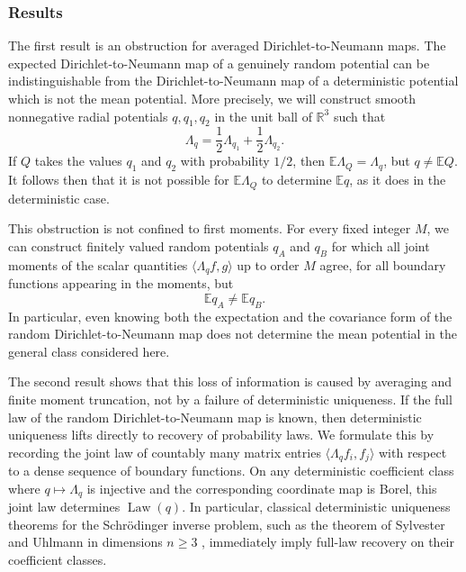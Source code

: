 \documentclass[11pt]{article}
\newcommand{\R}{\mathbb R}
\newcommand{\E}{\mathbb E}
\newcommand{\Law}{\operatorname{Law}}
\newcommand{\la}{\langle}
\newcommand{\ra}{\rangle}
\theoremstyle{plain}
\theoremstyle{definition}
\theoremstyle{remark}
\begin{document}
\subsubsection*{Results}

The first result is an obstruction for averaged Dirichlet-to-Neumann maps.  The expected Dirichlet-to-Neumann map of a genuinely random potential can be indistinguishable from the Dirichlet-to-Neumann map of a deterministic potential which is not the mean potential.  More precisely, we will construct smooth nonnegative radial potentials $q,q_1,q_2$ in the unit ball of $\R^3$ such that
\begin{equation}\label{eq:intro-DN-half}
  \Lambda_q=\frac12\Lambda_{q_1}+\frac12\Lambda_{q_2}.
\end{equation}
If $Q$ takes the values $q_1$ and $q_2$ with probability $1/2$, then $\E\Lambda_Q=\Lambda_q$, but $q\ne \E Q$.  It follows then that it is not possible for $\E\Lambda_Q$ to determine $\E q$, as it does in the deterministic case.

This obstruction is not confined to first moments.  For every fixed integer $M$, we can construct finitely valued random potentials $q_A$ and $q_B$ for which all joint moments of the scalar quantities $\la\Lambda_qf,g\ra$ up to order $M$ agree, for all boundary functions appearing in the moments, but
\[
  \E q_A\ne \E q_B.
\]
In particular, even knowing both the expectation and the covariance form of the random Dirichlet-to-Neumann map does not determine the mean potential in the general class considered here.

The second result shows that this loss of information is caused by averaging and finite moment truncation, not by a failure of deterministic uniqueness.  If the full law of the random Dirichlet-to-Neumann map is known, then deterministic uniqueness lifts directly to recovery of probability laws.  We formulate this by recording the joint law of countably many matrix entries $\la\Lambda_qf_i,f_j\ra$ with respect to a dense sequence of boundary functions.  On any deterministic coefficient class where $q\mapsto\Lambda_q$ is injective and the corresponding coordinate map is Borel, this joint law determines $\Law(q)$.  In particular, classical deterministic uniqueness theorems for the Schr\"odinger inverse problem, such as the theorem of Sylvester and Uhlmann in dimensions $n\ge3$ \cite{SylvesterUhlmann1987}, immediately imply full-law recovery on their coefficient classes.
\end{document}
